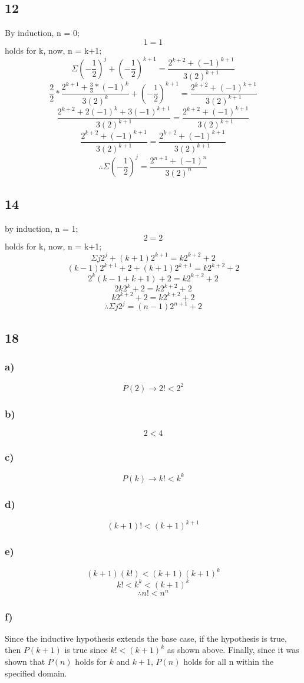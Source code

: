 \documentclass[journal]{IEEEtran}
\begin{document}
\subsection*{12}
By induction, n = 0;
$$1 = 1$$
holds for k, now, n = k+1;
$$\Sigma (-\frac{1}{2})^j + (-\frac{1}{2})^{k+1} = \frac{2^{k+2} + (-1)^{k+1}}{3(2)^{k+1}}$$
$$\frac{2}{2}*\frac{2^{k+1} + \frac{3}{3}*(-1)^{k}}{3(2)^{k}} + (-\frac{1}{2})^{k+1} = \frac{2^{k+2} + (-1)^{k+1}}{3(2)^{k+1}}$$
$$\frac{2^{k+2} + 2(-1)^{k} + 3(-1)^{k+1}}{3(2)^{k+1}} = \frac{2^{k+2} + (-1)^{k+1}}{3(2)^{k+1}}$$
$$\frac{2^{k+2} + (-1)^{k+1}}{3(2)^{k+1}} = \frac{2^{k+2} + (-1)^{k+1}}{3(2)^{k+1}}$$
$$\boxed{\therefore \Sigma (-\frac{1}{2})^j  = \frac{2^{n+1} + (-1)^{n}}{3(2)^{n}}}$$

\subsection*{14}
by induction, n = 1;
$$2=2$$
holds for k, now, n = k+1;
$$\Sigma j2^j + (k+1)2^{k+1}= k2^{k+2}+2$$
$$(k-1)2^{k+1} +2 + (k+1)2^{k+1}= k2^{k+2}+2$$
$$2^k(k-1+k+1) + 2 = k2^{k+2}+2$$
$$2k2^{k} + 2 = k2^{k+2}+2$$
$$k2^{k+2}+2 = k2^{k+2}+2$$
$$\boxed{\therefore \Sigma j2^j = (n-1)2^{n+1}+2}$$

\subsection*{18}
\subsubsection*{a)}
$$\boxed{P(2) \rightarrow 2! < 2^2}$$


\subsubsection*{b)}
$$\boxed{2 < 4}$$

\subsubsection*{c)}
$$\boxed{P(k) \rightarrow k! < k^k}$$

\subsubsection*{d)}
$$\boxed{(k+1)! < (k+1)^{k+1}}$$
\subsubsection*{e)}
$$(k+1)(k!) < (k+1)(k+1)^k$$
$$k! < k^k < (k+1)^k$$
$$\boxed{\therefore n! < n^n}$$

\subsubsection*{f)}
Since the inductive hypothesis extends the base case, 
if the hypothesis is true, then $P(k+1)$ is true since 
$k! < (k+1)^k$ as shown above. Finally, since it was shown 
that $P(n)$ holds for $k$ and $k+1$, $P(n)$ holds for all n within the specified domain.
\end{document}
